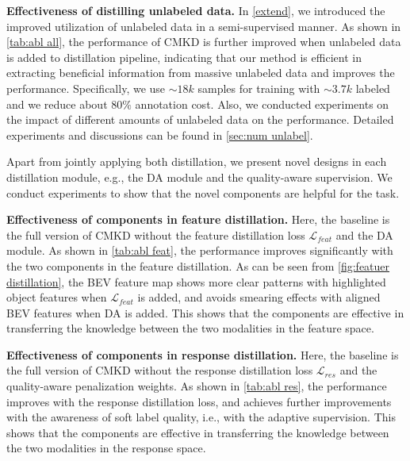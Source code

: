 \documentclass[runningheads]{llncs}
\begin{document}
\noindent\textbf{Effectiveness of distilling unlabeled data.}
In \cref{extend}, we introduced the improved utilization of unlabeled data in a semi-supervised manner. 
As shown in \cref{tab:abl all}, the performance of CMKD is further improved when unlabeled data is added to distillation pipeline, indicating that our method is efficient in extracting beneficial information from massive unlabeled data and improves the performance.
Specifically, we use $\sim18k$ samples for training with $\sim3.7k$ labeled and we reduce about $80\%$ annotation cost.
Also, we conducted experiments on the impact of different amounts of unlabeled data on the performance. 
Detailed experiments and discussions can be found in \cref{sec:num unlabel}.


Apart from jointly applying both distillation, we present novel designs in each distillation module, e.g., the DA module and the quality-aware supervision. We conduct experiments to show that the novel components are helpful for the task.

\noindent\textbf{Effectiveness of components in feature distillation.}
Here, the baseline is the full version of CMKD without the feature distillation loss $\mathcal{L}_{feat}$ and the DA module.
As shown in \cref{tab:abl feat}, the performance improves significantly with the two components in the feature distillation. 
As can be seen from \cref{fig:featuer distillation}, the BEV feature map shows more clear patterns with highlighted object features when $\mathcal{L}_{feat}$ is added, and avoids smearing effects with aligned BEV features when DA is added.
This shows that the components are effective in transferring the knowledge between the two modalities in the feature space.

\noindent\textbf{Effectiveness of components in response distillation.}
Here, the baseline is the full version of CMKD without the response distillation loss $\mathcal{L}_{res}$ and the quality-aware penalization weights.
As shown in \cref{tab:abl res}, the performance improves with the response distillation loss,
and achieves further improvements with the awareness of soft label quality, i.e., with the adaptive supervision.
This shows that the components are effective in transferring the knowledge between the two modalities in the response space.
\end{document}

